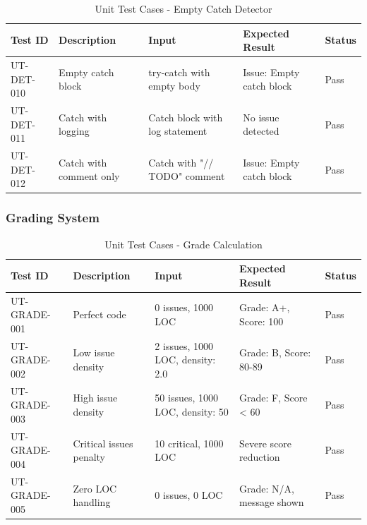 \documentclass[12pt,a4paper]{article}
\begin{document}
    \begin{table}[H]
        \caption{Unit Test Cases - Empty Catch Detector}
        \begin{tabular}{|p{2cm}|p{4cm}|p{3cm}|p{3cm}|p{1.5cm}|}
            \hline
            \textbf{Test ID} & \textbf{Description} & \textbf{Input} & \textbf{Expected Result} & \textbf{Status} \\
            \hline
            UT-DET-010 & Empty catch block & try-catch with empty body & Issue: Empty catch block & Pass \\
            \hline
            UT-DET-011 & Catch with logging & Catch block with log statement & No issue detected & Pass \\
            \hline
            UT-DET-012 & Catch with comment only & Catch with "// TODO" comment & Issue: Empty catch block & Pass \\
            \hline
        \end{tabular}
    \end{table}


    \subsubsection{Grading System}

    \begin{table}[H]
        \caption{Unit Test Cases - Grade Calculation}
        \begin{tabular}{|p{2cm}|p{4cm}|p{3cm}|p{3cm}|p{1.5cm}|}
            \hline
            \textbf{Test ID} & \textbf{Description} & \textbf{Input} & \textbf{Expected Result} & \textbf{Status} \\
            \hline
            UT-GRADE-001 & Perfect code & 0 issues, 1000 LOC & Grade: A+, Score: 100 & Pass \\
            \hline
            UT-GRADE-002 & Low issue density & 2 issues, 1000 LOC, density: 2.0 & Grade: B, Score: 80-89 & Pass \\
            \hline
            UT-GRADE-003 & High issue density & 50 issues, 1000 LOC, density: 50 & Grade: F, Score < 60 & Pass \\
            \hline
            UT-GRADE-004 & Critical issues penalty & 10 critical, 1000 LOC & Severe score reduction & Pass \\
            \hline
            UT-GRADE-005 & Zero LOC handling & 0 issues, 0 LOC & Grade: N/A, message shown & Pass \\
            \hline
        \end{tabular}
    \end{table}
\end{document}
